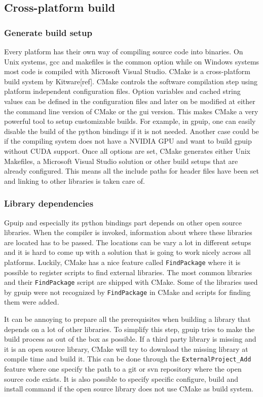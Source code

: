 \subsection{Cross-platform build}
\subsubsection{Generate build setup}
Every platform has their own way of compiling source code into binaries. On Unix systems, gcc and makefiles is the common option while on Windows systems most code is compiled with Microsoft Visual Studio. CMake is a cross-platform build system by Kitware[ref]. CMake controls the software compilation step using platform independent configuration files. Option variables and cached string values can be defined in the configuration files and later on be modified at either the command line version of CMake or the gui version. This makes CMake a very powerful tool to setup customizable builds. For example, in gpuip, one can easily disable the build of the python bindings if it is not needed. Another case could be if the compiling system does not have a NVIDIA GPU and want to build gpuip without CUDA support. Once all options are set, CMake generates either Unix Makefiles, a Microsoft Visual Studio solution or other build setups that are already configured. This means all the include paths for header files have been set and linking to other libraries is taken care of.

\subsubsection{Library dependencies}
Gpuip and especially its python bindings part depends on other open source libraries. When the compiler is invoked, information about where these libraries are located has to be passed. The locations can be vary a lot in different setups and it is hard to come up with a solution that is going to work nicely across all platforms. Luckily, CMake has a nice feature called {\tt FindPackage} where it is possible to register scripts to find external libraries. The most common libraries and their {\tt FindPackage} script are shipped with CMake. Some of the libraries used by gpuip were not recognized by {\tt FindPackage} in CMake and scripts for finding them were added.
\newline

It can be annoying to prepare all the prerequisites when building a library that depends on a lot of other libraries. To simplify this step, gpuip tries to make the build process as out of the box as possible. If a third party library is missing and it is an open source library, CMake will try to download the missing library at compile time and build it. This can be done through the {\tt ExternalProject\_Add} feature where one specify the path to a git or svn repository where the open source code exists. It is also possible to specify specific configure, build and install command if the open source library does not use CMake as build system.

